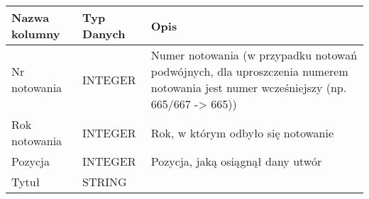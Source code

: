 \documentclass[11pt]{article}
\begin{document}
\begin{longtable}[]{@{}lll@{}}
\toprule
\begin{minipage}[b]{0.30\columnwidth}\raggedright
Nazwa kolumny\strut
\end{minipage} & \begin{minipage}[b]{0.30\columnwidth}\raggedright
Typ Danych\strut
\end{minipage} & \begin{minipage}[b]{0.30\columnwidth}\raggedright
Opis\strut
\end{minipage}\tabularnewline
\midrule
\endhead
\begin{minipage}[t]{0.30\columnwidth}\raggedright
Nr notowania\strut
\end{minipage} & \begin{minipage}[t]{0.30\columnwidth}\raggedright
INTEGER\strut
\end{minipage} & \begin{minipage}[t]{0.30\columnwidth}\raggedright
Numer notowania (w przypadku notowań podwójnych, dla uproszczenia
numerem notowania jest numer wcześniejszy (np. 665/667 -\textgreater{}
665))\strut
\end{minipage}\tabularnewline
\begin{minipage}[t]{0.30\columnwidth}\raggedright
Rok notowania\strut
\end{minipage} & \begin{minipage}[t]{0.30\columnwidth}\raggedright
INTEGER\strut
\end{minipage} & \begin{minipage}[t]{0.30\columnwidth}\raggedright
Rok, w którym odbyło się notowanie\strut
\end{minipage}\tabularnewline
\begin{minipage}[t]{0.30\columnwidth}\raggedright
Pozycja\strut
\end{minipage} & \begin{minipage}[t]{0.30\columnwidth}\raggedright
INTEGER\strut
\end{minipage} & \begin{minipage}[t]{0.30\columnwidth}\raggedright
Pozycja, jaką osiągnął dany utwór\strut
\end{minipage}\tabularnewline
\begin{minipage}[t]{0.30\columnwidth}\raggedright
Tytuł\strut
\end{minipage} & \begin{minipage}[t]{0.30\columnwidth}\raggedright
STRING\strut
\end{minipage} & \begin{minipage}[t]{0.30\columnwidth}\raggedright

\end{minipage}
\end{longtable}
\end{document}
